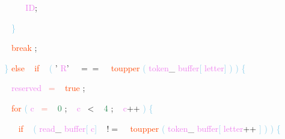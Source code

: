 \documentclass[8, usernames, dvipsnames]{beamer}
\begin{document}
\begin{frame}
\textcolor{White}{\   }
\textcolor{White}{\   }
\textcolor{White}{\   }
\textcolor{White}{\   }
\textcolor{OrangeRed}{	}
\textcolor{White}{\ }
\textcolor{Violet}{ID}\textcolor{Sepia}{;}

 \textcolor{White}{\   }
\textcolor{White}{\   }
\textcolor{White}{\   }
\textcolor{SkyBlue}{\} }

 \textcolor{White}{\   }
\textcolor{White}{\   }
\textcolor{White}{\   }
\textcolor{OrangeRed}{break}
\textcolor{Sepia}{;}

 \textcolor{White}{\   }
\textcolor{White}{\   }
\textcolor{SkyBlue}{\} }
\textcolor{OrangeRed}{else}
\textcolor{White}{\ }
\textcolor{OrangeRed}{if}
\textcolor{White}{\ }
\textcolor{SkyBlue}{(}
\textcolor{BurntOrange}{'}
\textcolor{Violet}{R}\textcolor{BurntOrange}{'}
\textcolor{White}{\ }
\textcolor{OliveGreen}{$==$}
\textcolor{White}{\ }
\textcolor{OrangeRed}{toupper}
\textcolor{SkyBlue}{(}
\textcolor{Violet}{token}\textcolor{Sepia}{\_}
\textcolor{Violet}{buffer}\textcolor{SkyBlue}{[}
\textcolor{Violet}{letter}\textcolor{SkyBlue}{]}
\textcolor{SkyBlue}{)}
\textcolor{SkyBlue}{)}
\textcolor{SkyBlue}{\{ }

 \textcolor{White}{\   }
\textcolor{White}{\   }
\textcolor{White}{\   }
\textcolor{Violet}{reserved}\textcolor{White}{\ }
\textcolor{Salmon}{=}
\textcolor{White}{\ }
\textcolor{OrangeRed}{true}
\textcolor{Sepia}{;}

 \textcolor{White}{\   }
\textcolor{White}{\   }
\textcolor{White}{\   }
\textcolor{OrangeRed}{for}
\textcolor{SkyBlue}{(}
\textcolor{Violet}{c}\textcolor{White}{\ }
\textcolor{Salmon}{=}
\textcolor{White}{\ }
\textcolor{SeaGreen}{0}
\textcolor{Sepia}{;}
\textcolor{White}{\ }
\textcolor{Violet}{c}\textcolor{White}{\ }
\textcolor{OliveGreen}{\textless}
\textcolor{White}{\ }
\textcolor{SeaGreen}{4}
\textcolor{Sepia}{;}
\textcolor{White}{\ }
\textcolor{Violet}{c}\textcolor{Apricot}{++}
\textcolor{SkyBlue}{)}
\textcolor{SkyBlue}{\{ }

 \textcolor{White}{\   }
\textcolor{White}{\   }
\textcolor{White}{\   }
\textcolor{White}{\   }
\textcolor{OrangeRed}{if}
\textcolor{White}{\ }
\textcolor{SkyBlue}{(}
\textcolor{Violet}{read}\textcolor{Sepia}{\_}
\textcolor{Violet}{buffer}\textcolor{SkyBlue}{[}
\textcolor{Violet}{c}\textcolor{SkyBlue}{]}
\textcolor{White}{\ }
\textcolor{OliveGreen}{$!=$}
\textcolor{White}{\ }
\textcolor{OrangeRed}{toupper}
\textcolor{SkyBlue}{(}
\textcolor{Violet}{token}\textcolor{Sepia}{\_}
\textcolor{Violet}{buffer}\textcolor{SkyBlue}{[}
\textcolor{Violet}{letter}\textcolor{Apricot}{++}
\textcolor{SkyBlue}{]}
\textcolor{SkyBlue}{)}
\textcolor{SkyBlue}{)}
\textcolor{SkyBlue}{\{ }


\end{frame}
\end{document}
